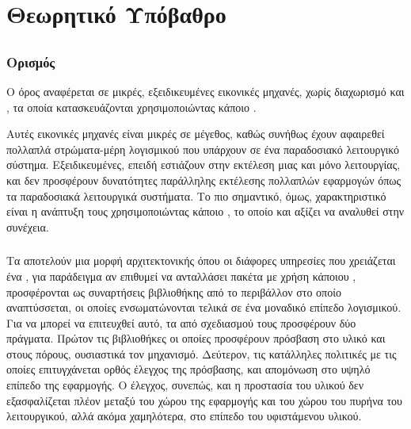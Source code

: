 \chapter{Θεωρητικό Υπόβαθρο}

\section{}

\subsection{Ορισμός}

Ο όρος  αναφέρεται σε μικρές, εξειδικευμένες εικονικές μηχανές,
χωρίς διαχωρισμό  και , τα οποία κατασκευάζονται
χρησιμοποιώντας κάποιο \cite{unikernelsDef}.
\newline

Αυτές εικονικές μηχανές είναι μικρές σε μέγεθος, καθώς συνήθως έχουν
αφαιρεθεί πολλαπλά στρώματα-μέρη λογισμικού που υπάρχουν σε ένα παραδοσιακό
λειτουργικό σύστημα. Εξειδικευμένες, επειδή εστιάζουν στην εκτέλεση μιας
και μόνο λειτουργίας, και δεν προσφέρουν δυνατότητες παράλληλης εκτέλεσης
πολλαπλών εφαρμογών όπως τα παραδοσιακά λειτουργικά συστήματα. Το πιο
σημαντικό, όμως, χαρακτηριστικό είναι η ανάπτυξη τους χρησιμοποιώντας
κάποιο , το οποίο και αξίζει να αναλυθεί στην συνέχεια.






\subsection{}

Τα  αποτελούν μια μορφή αρχιτεκτονικής
όπου οι διάφορες υπηρεσίες που χρειάζεται ένα 
, για παράδειγμα αν επιθυμεί να ανταλλάσει πακέτα
με χρήση κάποιου , προσφέρονται ως συναρτήσεις
βιβλιοθήκης από το περιβάλλον στο οποίο αναπτύσσεται, οι οποίες
ενσωματώνονται τελικά σε ένα μοναδικό επίπεδο λογισμικού. Για
να μπορεί να επιτευχθεί αυτό, τα 
από σχεδιασμού τους προσφέρουν δύο πράγματα. Πρώτον τις βιβλιοθήκες
οι οποίες προσφέρουν πρόσβαση στο υλικό και στους πόρους,
ουσιαστικά τον μηχανισμό. Δεύτερον, τις κατάλληλες πολιτικές με
τις οποίες επιτυγχάνεται ορθός έλεγχος της πρόσβασης, και απομόνωση
στο υψηλό επίπεδο της εφαρμογής. Ο έλεγχος, συνεπώς, και η προστασία
του υλικού δεν εξασφαλίζεται πλέον μεταξύ του χώρου της
εφαρμογής και του χώρου του πυρήνα του λειτουργικού, αλλά ακόμα
χαμηλότερα, στο επίπεδο του υφιστάμενου υλικού\cite{riseOfVirtLibOS}.
\newline

